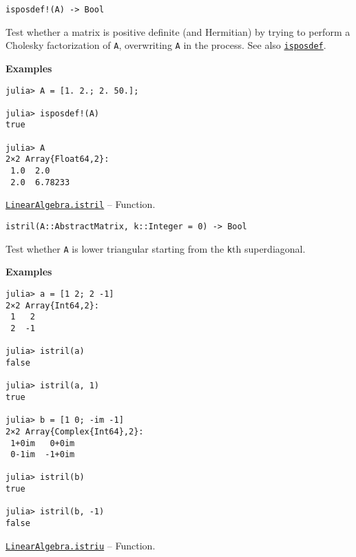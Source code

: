 \begin{adjustwidth}{2em}{0pt}


\begin{verbatim}
isposdef!(A) -> Bool
\end{verbatim}

Test whether a matrix is positive definite (and Hermitian) by trying to perform a Cholesky factorization of \texttt{A}, overwriting \texttt{A} in the process. See also \hyperlink{13841568437070319804}{\texttt{isposdef}}.

\textbf{Examples}


\begin{verbatim}
julia> A = [1. 2.; 2. 50.];

julia> isposdef!(A)
true

julia> A
2×2 Array{Float64,2}:
 1.0  2.0
 2.0  6.78233
\end{verbatim}



\end{adjustwidth}
\hypertarget{14402064054856945387}{} 
\hyperlink{14402064054856945387}{\texttt{LinearAlgebra.istril}}  -- {Function.}

\begin{adjustwidth}{2em}{0pt}


\begin{verbatim}
istril(A::AbstractMatrix, k::Integer = 0) -> Bool
\end{verbatim}

Test whether \texttt{A} is lower triangular starting from the \texttt{k}th superdiagonal.

\textbf{Examples}


\begin{verbatim}
julia> a = [1 2; 2 -1]
2×2 Array{Int64,2}:
 1   2
 2  -1

julia> istril(a)
false

julia> istril(a, 1)
true

julia> b = [1 0; -im -1]
2×2 Array{Complex{Int64},2}:
 1+0im   0+0im
 0-1im  -1+0im

julia> istril(b)
true

julia> istril(b, -1)
false
\end{verbatim}



\end{adjustwidth}
\hypertarget{15000310211103088559}{} 
\hyperlink{15000310211103088559}{\texttt{LinearAlgebra.istriu}}  -- {Function.}


